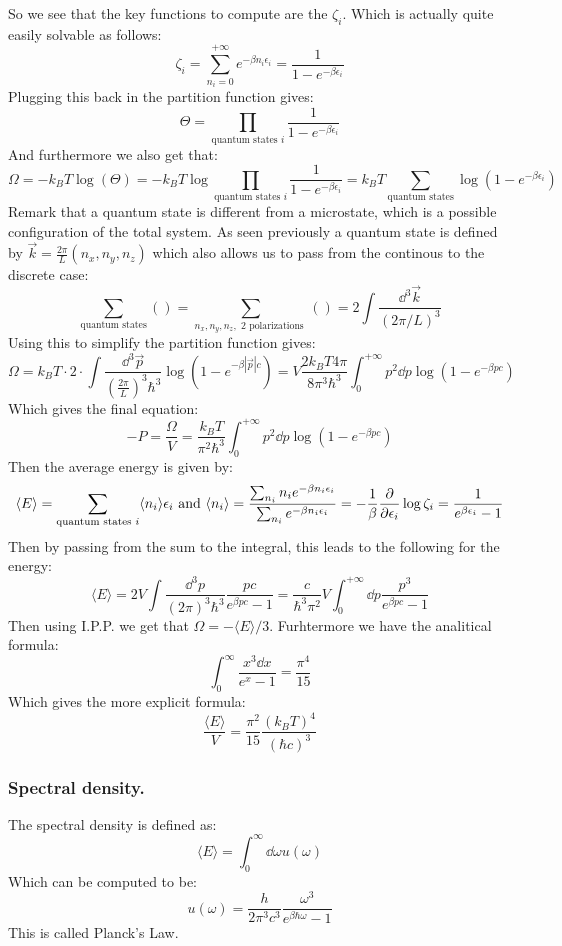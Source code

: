 \documentclass[10pt,a4paper]{book}
\begin{document}
So we see that the key functions to compute are the $\zeta_i$. Which is actually quite easily solvable as follows:
\[
\zeta_i = \sum_{n_i = 0}^{+\infty} e^{-\beta n_i \epsilon_i} = \frac{1}{1 - e^{-\beta \epsilon_i}}
\]
Plugging this back in the partition function gives:
\[
\Theta = \prod_{\text{quantum states } i} \frac{1}{1 - e^{-\beta \epsilon_i}}
\]
And furthermore we also get that:
\[
\Omega = - k_B T \log (\Theta) = - k_B T \log \prod_{\text{quantum states } i} \frac{1}{1 - e^{-\beta \epsilon_i}} = k_B T \sum_{\text{quantum states}} \log (1 - e^{-\beta \epsilon_i})
\]
Remark that a quantum state is different from a microstate, which is a possible configuration of the total system. As seen previously a quantum state is defined by $\vec{k} = \frac{2 \pi}{L} (n_x, n_y, n_z)$ which also allows us to pass from the continous to the discrete case:
\[\sum_\text{quantum states} ()= \sum_{n_x, n_y, n_z, \text{ 2 polarizations } } ()= 2 \int \frac{\dd^3 \vec{k}}{(2\pi/ L)^3}
\]
Using this to simplify the partition function gives:
\[
\Omega = k_B T \cdot 2 \cdot \int \frac{\dd^3 \vec{p}}{(\frac{2\pi}{L})^3 \hbar^3} \log(1 - e^{-\beta |\vec{p}| c}) = V \frac{2 k_B T 4 \pi}{8 \pi^3 \hbar^3} \int_0^{+\infty}p^2 \dd p \log(1 - e^{-\beta p c})
\]
Which gives the final equation:
\[
-P=\frac{\Omega}{V} = \frac{k_B T}{\pi^2 \hbar^3} \int_0^{+\infty} p^2 \dd p \log(1 - e^{-\beta p c})
\]
Then the average energy is given by:
\[
\langle E \rangle = \sum_{\text{quantum states } i} \langle n_i \rangle \epsilon_i \text{  and } \langle n_i \rangle = \frac{\sum_{n_i} n_i e^{-\beta n_i \epsilon_i}}{\sum_{n_i} e^{-\beta n_i \epsilon_i}} = -\frac{1}{\beta} \pdv{}{\epsilon_i} \log \zeta_i =  \frac{1}{e^{\beta \epsilon_i} - 1}
\]
Then by passing from the sum to the integral, this leads to the following for the energy:
\[
\langle E \rangle = 2 V \int \frac{\dd^3 p}{(2 \pi)^3 \hbar^3} \frac{pc}{e^{\beta pc} - 1} = \frac{c}{\hbar^3 \pi^2} V \int_0^{+\infty} \dd p \frac{p^3}{e^{\beta p c} - 1} 
\]
Then using I.P.P. we get that $\Omega = - \langle E \rangle / 3$. Furhtermore we have the analitical formula:
\[
\int_0^\infty \frac{x^3 \dd x} {e^x - 1} = \frac{\pi^4}{15}
\]
Which gives the more explicit formula:
\[
\frac{\langle E \rangle}{V} = \frac{\pi^2}{15} \frac{(k_B T)^4}{(\hbar c)^3}
\]
\subsubsection{Spectral density.}
The spectral density is defined as:
\[
\langle E \rangle = \int_0^\infty \dd \omega u(\omega)
\]
Which can be computed to be:
\[
u(\omega) = \frac{h}{2\pi^3 c^3} \frac{\omega^3}{e^{\beta \hbar \omega} - 1}
\]
This is called Planck's Law.
\end{document}
